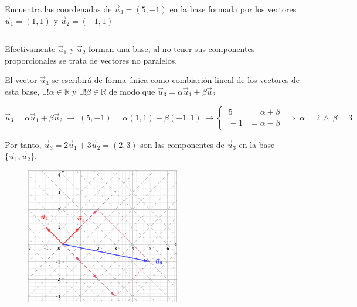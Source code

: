 \begin{miejercicio}

Encuentra las coordenadas de $\vec u_3=(5,-1)$ en la base formada por los vectores $\vec u_1=(1,1)$ y $\vec u_2=(-1,1)$

\rule{250pt}{0.1pt}

\vspace{2mm} Efectivamente $\vec u_1$ y $\vec u_2$ forman una base, al no tener sus componentes proporcionales se trata de vectores no paralelos.

\vspace{2mm} El vector $\vec u_3$ se escribirá de forma única como combiación lineal de los vectores de esta base, $\exists! \alpha \in \mathbb R$ y $\exists! \beta \in \mathbb R$ de modo que $\vec u_3=\alpha \vec u_1+\beta \vec u_2$

\vspace{2mm} $\vec u_3=\alpha \vec u_1+\beta \vec u_2 \ \to \ (5,-1)=\alpha(1,1)+\beta(-1,1) \ \to \begin{cases} \ 5&=\alpha+\beta  \\ \ -1&=\alpha-\beta \end{cases} \ \Rightarrow \ \alpha=2 \ \wedge \ \beta=3$

\vspace{2mm} Por tanto, $\vec u_3=2\vec u_1+3\vec u_2=(2,3)$ son las componentes de $\vec u_3$ en la base $\{\vec u_1, \vec u_2\}$.

\vspace{4mm}
\begin{figure}[H]
	\centering
	\includegraphics[width=0.6\textwidth]{img-vec/vec11.png}	
\end{figure}
\vspace{2mm}
\end{miejercicio}



